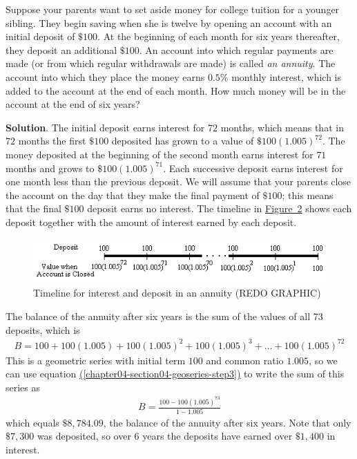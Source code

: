 \documentclass[10pt,]{book}
\theoremstyle{ptxdefinitionnotitle}
\theoremstyle{ptxdefinitiontitle}
\theoremstyle{ptxdefinitionnotitle}
\theoremstyle{ptxdefinitiontitle}
\theoremstyle{ptxdefinitionnotitle}
\theoremstyle{ptxdefinitiontitle}
\numberwithin{equation}{section}
\begin{document}
\begin{example}\label{value-on-an-annuity}
\hypertarget{p-152}{}%
Suppose your parents want to set aside money for college tuition for a younger sibling.  They begin saving when she is twelve by opening an account with an initial deposit of \(\$100\).  At the beginning of each month for six years thereafter, they deposit an additional \(\$100\).  An account into which regular payments are made (or from which regular withdrawals are made) is called \emph{an annuity}.  The account into which they place the money earns \(0.5\%\) monthly interest, which is added to the account at the end of each month.  How much money will be in the account at the end of six years?%
\par\smallskip%
\noindent\textbf{Solution}.\hypertarget{solution-11}{}\quad%
\hypertarget{p-153}{}%
The initial deposit earns interest for \(72\) months, which means that in \(72\) months the first \(\$100\) deposited has grown to a value of \(\$100(1.005)^{72}\).  The money deposited at the beginning of the second month earns interest for \(71\) months and grows to \(\$100(1.005)^{71}\).  Each successive deposit earns interest for one month less than the previous deposit.  We will assume that your parents close the account on the day that they make the final payment of \(\$100\); this means that the final \(\$100\) deposit earns no interest.  The timeline in \hyperref[deposit-timeline]{Figure~2} shows each deposit together with the amount of interest earned by each deposit.%
\begin{figure}
\centering
\includegraphics[width=0.8\linewidth]{src/images/chapter04-section04-depositchart.png}
\caption{Timeline for interest and deposit in an annuity (REDO GRAPHIC)\label{deposit-timeline}}
\end{figure}
\hypertarget{p-154}{}%
The balance of the annuity after six years is the sum of the values of all 73 deposits, which is%
\begin{gather*}
B = 100 + 100(1.005) + 100(1.005)^2 + 100(1.005)^3 + ... + 100(1.005)^{72}
\end{gather*}
This is a geometric series with initial term \(100\) and common ratio \(1.005\), so we can use equation \hyperref[chapter04-section04-geoseries-step3]{(\ref{chapter04-section04-geoseries-step3})} to write the sum of this series as%
\begin{gather}
B= \frac{100-100(1.005)^{73}}{1-1.005}\label{mrow-80}
\end{gather}
which equals \(\$8,784.09\), the balance of the annuity after six years.  Note that only \(\$7,300\) was deposited, so over \(6\) years the deposits have earned over \(\$1,400\) in interest.%
\end{example}
\end{document}
